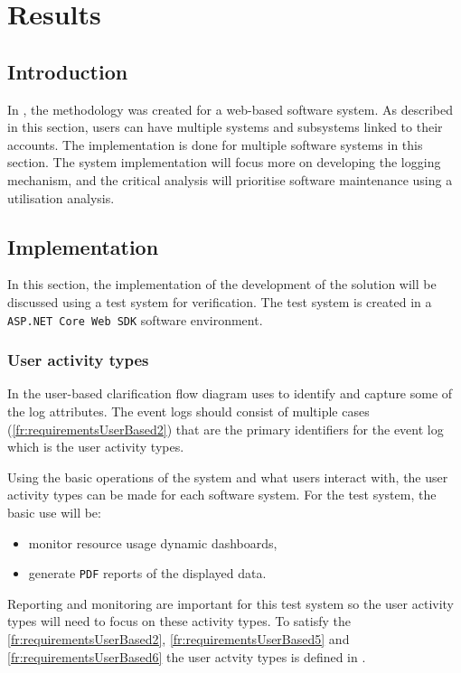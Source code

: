 \chapter{Results}
\label{chap:3}

\section{Introduction}
In , the methodology was created for a web-based software system. As described in this section, users can have multiple systems and subsystems linked to their accounts. The implementation is done for multiple software systems in this section. The system implementation will focus more on developing the logging mechanism, and the critical analysis will prioritise software maintenance using a utilisation analysis.

\section{Implementation}\label{sec:ch3_implementation}
In this section, the implementation of the development of the solution will be discussed using a test system for verification. The test system is created in a \texttt{ASP.NET Core Web SDK} software environment.

\subsection{User activity types}
In  the user-based clarification flow diagram uses   to identify and capture some of the log attributes. The event logs should consist of multiple cases (\ref{fr:requirementsUserBased2}) that are the primary identifiers for the event log which is the user activity types.\par Using the basic operations of the system and what users interact with, the user activity types can be made for each software system. For the test system, the basic use will be:

\begin{itemize}
	\item monitor resource usage dynamic dashboards,
	\item generate \texttt{PDF} reports of the displayed data.
\end{itemize}

Reporting and monitoring are important for this test system so the user activity types will need to focus on these activity types. To satisfy the \ref{fr:requirementsUserBased2}, \ref{fr:requirementsUserBased5} and \ref{fr:requirementsUserBased6} the user actvity types is defined in .

